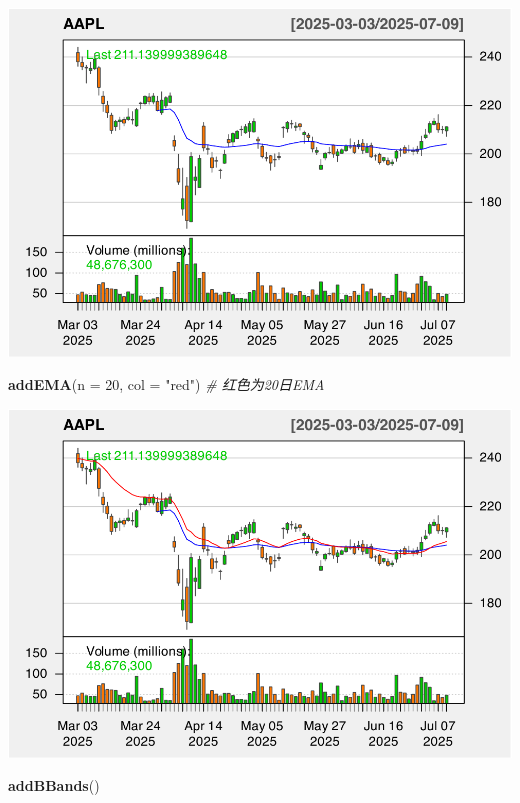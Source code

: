 \documentclass[]{ctexbook}
\newenvironment{Shaded}{\begin{snugshade}}{\end{snugshade}}
\newcommand{\AttributeTok}[1]{\textcolor[rgb]{0.13,0.29,0.53}{#1}}
\newcommand{\CommentTok}[1]{\textcolor[rgb]{0.56,0.35,0.01}{\textit{#1}}}
\newcommand{\DecValTok}[1]{\textcolor[rgb]{0.00,0.00,0.81}{#1}}
\newcommand{\FunctionTok}[1]{\textcolor[rgb]{0.13,0.29,0.53}{\textbf{#1}}}
\newcommand{\NormalTok}[1]{#1}
\newcommand{\StringTok}[1]{\textcolor[rgb]{0.31,0.60,0.02}{#1}}
\begin{document}
\includegraphics[width=0.9\linewidth]{quantmod_files/figure-latex/evwma_2-2}

\begin{Shaded}
\begin{Highlighting}[]
\FunctionTok{addEMA}\NormalTok{(}\AttributeTok{n =} \DecValTok{20}\NormalTok{, }\AttributeTok{col =} \StringTok{"red"}\NormalTok{)      }\CommentTok{\# 红色为20日EMA}
\end{Highlighting}
\end{Shaded}

\includegraphics[width=0.9\linewidth]{quantmod_files/figure-latex/evwma_2-3}

\begin{Shaded}
\begin{Highlighting}[]
\FunctionTok{addBBands}\NormalTok{()}
\end{Highlighting}
\end{Shaded}
\end{document}
